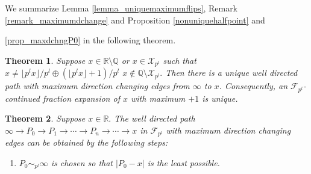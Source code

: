 \documentclass[12pt]{elsarticle}
\newtheorem{theorem}{Theorem}[section]
\theoremstyle{definition}
\newcommand{\field}[1]{\mathbb{#1}}          \newcommand{\Q}{\field{Q}}
\newcommand{\R}{\field{R}}                   \newcommand{\Z}{\field{Z}}
\newcommand{\mX}{{\mathcal X}}
\newcommand{\f}{{\mathcal F}}
\begin{document}
 We summarize Lemma \ref{lemma_uniquemaximumflips}, Remark \ref{remark_maximumdchange} and Proposition \ref{nonuniquehalfpoint} and { \ref{prop_maxdchngP0} in the following theorem.
\begin{theorem}\label{uniquemaximumflips}Suppose $x\in\R\setminus\Q$ or $x\in\mX_{p^l}$ such that $x\ne\lfloor p^lx\rfloor/p^l\oplus (\lfloor p^lx\rfloor+1)/p^l$ $x\not\in\Q\setminus\mX_{p^l}.$ Then 
	 there is a unique  well directed path with  maximum direction changing edges from $\infty$ to $x$. Consequently, an $\f_{p^l}$-continued fraction expansion of $x$ with maximum $+1$   is unique.
\end{theorem} 
 
 

 
% 		
 \begin{theorem}\label{pathwithmaximumflips}
 	Suppose $x\in\R.$ The well directed path $\infty\to P_0\to P_1\to\cdots\to P_n\to\cdots\to x$   in $\f_{p^l}$ with maximum direction changing edges can be obtained by the following steps:
 	\begin{enumerate}
 		\item $P_0\sim_{p^l}\infty$ is chosen so that $|P_0-x|$ is the least possible.


\end{enumerate}
\end{theorem}}
\end{document}

